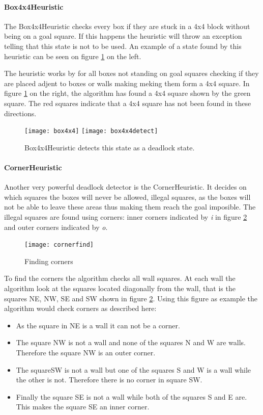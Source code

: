 \paragraph{Box4x4Heuristic}The Box4x4Heuristic checks every box if
they are stuck in a 4x4 block without being on a goal square. If this
happens the heuristic will throw an exception telling that this state
is not to be used. An example of a state found by this heuristic can
be seen on figure \ref{fig:box4x4} on the left.

The heuristic works by for all boxes not standing on goal squares
checking if they are placed adjent to boxes or walls making meking
them form a 4x4 square. In figure \ref{fig:box4x4} on the right, the
algorithm has found a 4x4 square shown by the green square. The red
squares indicate that a 4x4 square has not been found in these
directions.

\begin{figure}[htp]
  \centering
  \texttt{[image: box4x4]}
  \texttt{[image: box4x4detect]}
  \caption{Box4x4Heuristic detects this state as a deadlock state.}
  \label{fig:box4x4}
\end{figure}

\paragraph{CornerHeuristic}Another very powerful deadlock detector is
the CornerHeuristic. It decides on which squares the boxes will never
be allowed, illegal squares, as the boxes will not be able to leave
these areas thus making them reach the goal imposible. The illegal
squares are found using corners: inner corners indicated by \textit{i}
in figure \ref{fig:cornerheuristic} and outer corners indicated by
\textit{o}.
\begin{figure}[htp]
  \centering
  \texttt{[image: cornerfind]}
  \caption{Finding corners}
  \label{fig:cornerheuristic}
\end{figure}
To find the corners the algorithm checks all wall squares. At each
wall the algorithm look at the squares located diagonally from the
wall, that is the squares NE, NW, SE and SW shown in figure
\ref{fig:cornerheuristic}. Using this figure as example the algorithm
would check corners as described here:
\begin{itemize}
\item As the square in NE is a wall it can not be a corner.
\item The square NW is not a wall and none of the squares N and W are
  walls. Therefore the square NW is an outer corner.
\item The squareSW is not a wall but one of the squares S and W is a
  wall while the other is not. Therefore there is no corner in square
  SW.
\item Finally the square SE is not a wall while both of the squares S
  and E are. This makes the square SE an inner corner.
\end{itemize}

